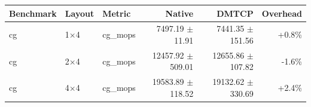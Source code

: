 \begin{tabular}{lllrrr}
\toprule
Benchmark & Layout & Metric & Native & DMTCP & Overhead \\
\midrule
cg & 1$\times$4 & cg\_mops & 7497.19 $\pm$ 11.91 & 7441.35 $\pm$ 151.56 & +0.8\% \\
cg & 2$\times$4 & cg\_mops & 12457.92 $\pm$ 509.01 & 12655.86 $\pm$ 107.82 & -1.6\% \\
cg & 4$\times$4 & cg\_mops & 19583.89 $\pm$ 118.52 & 19132.62 $\pm$ 330.69 & +2.4\% \\
\bottomrule
\end{tabular}
